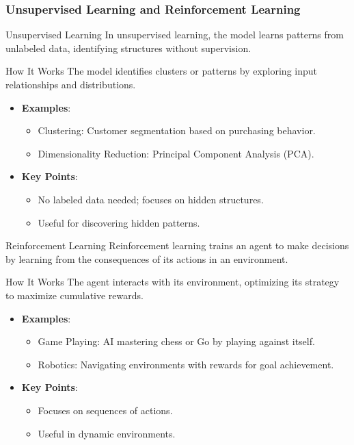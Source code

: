 \documentclass[aspectratio=169]{beamer}
\begin{document}
\begin{frame}[fragile]
    \frametitle{Unsupervised Learning and Reinforcement Learning}
    \begin{block}{Unsupervised Learning}
        In unsupervised learning, the model learns patterns from unlabeled data, identifying structures without supervision.
    \end{block}
    
    \begin{block}{How It Works}
        The model identifies clusters or patterns by exploring input relationships and distributions.
    \end{block}
    
    \begin{itemize}
        \item \textbf{Examples}:
        \begin{itemize}
            \item Clustering: Customer segmentation based on purchasing behavior.
            \item Dimensionality Reduction: Principal Component Analysis (PCA).
        \end{itemize}
        \item \textbf{Key Points}:
        \begin{itemize}
            \item No labeled data needed; focuses on hidden structures.
            \item Useful for discovering hidden patterns.
        \end{itemize}
    \end{itemize}

    \begin{block}{Reinforcement Learning}
        Reinforcement learning trains an agent to make decisions by learning from the consequences of its actions in an environment.
    \end{block}
    
    \begin{block}{How It Works}
        The agent interacts with its environment, optimizing its strategy to maximize cumulative rewards.
    \end{block}
    
    \begin{itemize}
        \item \textbf{Examples}:
        \begin{itemize}
            \item Game Playing: AI mastering chess or Go by playing against itself.
            \item Robotics: Navigating environments with rewards for goal achievement.
        \end{itemize}
        \item \textbf{Key Points}:
        \begin{itemize}
            \item Focuses on sequences of actions.
            \item Useful in dynamic environments.
        \end{itemize}
    \end{itemize}
\end{frame}
\end{document}
